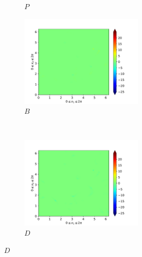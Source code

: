\begin{figure}[H]
\begin{subfigure}{0.45\textwidth}
        \caption{$P$}
    \end{subfigure}
    \newline
    \begin{subfigure}{0.45\textwidth}
        \includegraphics[height=1.75in]{media/run-cds-65/B-ke-1360}
        \caption{$B$}
    \end{subfigure}
    ~
    \begin{subfigure}{0.45\textwidth}
        \includegraphics[height=1.75in]{media/run-cds-65/D-ke-1360}
        \caption{$D$}
    \end{subfigure}
\end{figure}

\newpage
